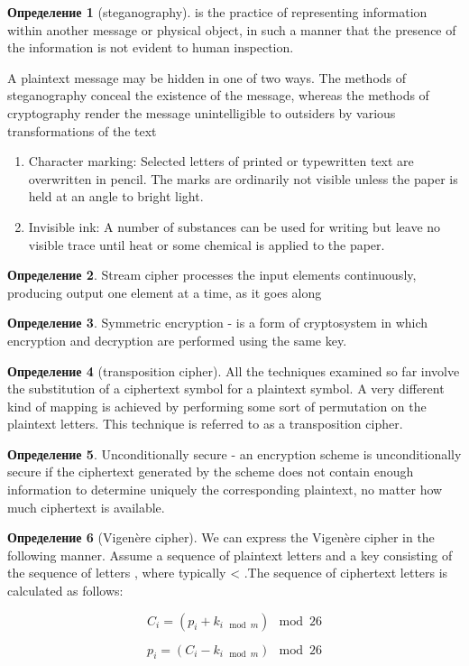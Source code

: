 \documentclass[a4paper]{article}
\theoremstyle{definition}
\newtheorem*{definition}{Определение}
\theoremstyle{remark}
\begin{document}
\begin{definition}[steganography]
    is the practice of representing information within another message or physical object,
     in such a manner that the presence of the information is not evident to human inspection.

     A plaintext message may be hidden in one of two ways. The methods of
steganography conceal the existence of the message, whereas the methods of cryptography render the message unintelligible to outsiders by various transformations
of the text
\begin{enumerate}
    \item Character marking: Selected letters of printed or typewritten text are overwritten in pencil. The marks are ordinarily not visible unless the paper is held
    at an angle to bright light.
    \item Invisible ink: A number of substances can be used for writing but leave no
    visible trace until heat or some chemical is applied to the paper.
\end{enumerate}
\end{definition}

\begin{definition}
    Stream cipher processes the input elements continuously,
producing output one element at a time, as it goes along
\end{definition}
\begin{definition}
    Symmetric encryption - is a form of cryptosystem in which encryption and
    decryption are performed using the same key.
\end{definition}

\begin{definition}[transposition cipher]
    All the techniques examined so far involve the substitution of a ciphertext symbol
for a plaintext symbol. A very different kind of mapping is achieved by performing
some sort of permutation on the plaintext letters. This technique is referred to as a
transposition cipher.
\end{definition}

\begin{definition}
    Unconditionally secure - an encryption scheme is
unconditionally secure if the ciphertext generated by the scheme does not contain enough information
 to determine uniquely the corresponding plaintext, no
matter how much ciphertext is available.
\end{definition}

\begin{definition}[Vigenère cipher]
    We can express the Vigenère cipher in the following manner. Assume a
sequence of plaintext letters and a key consisting of the
sequence of letters , where typically < .The sequence of
ciphertext letters is calculated as follows:

$$C_i = (p_i + k_{i \mod m}) \mod 26$$

$$p_i = (C_i - k_{i\mod m}) \mod 26$$
\end{definition}
\end{document}

